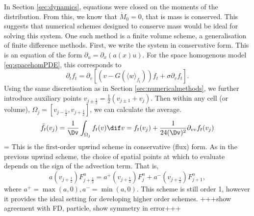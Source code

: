 In Section \ref{sec:dynamics}, equations were closed on the moments of the distribution. From this, we know that \(\dot{M}_0 = 0\), that is mass is conserved. This suggests that numerical schemes designed to conserve mass would be ideal for solving this system. One such method is a finite volume scheme, a generalisation of finite difference methods. First, we write the system in conservative form. This is an equation of the form $\partial_ u = \partial_x(a(x)u)$. For the space homogenous model \eqref{eq:spacehomPDE}, this corresponds to
\begin{equation}\label{eq:fluxspacehom}
\partial_t f_t = \partial_v \left[\left(v-G(\langle w \rangle_{f_t})\right)f_t + \sigma \partial_v f_t \right].
\end{equation}
Using the same discretisation as in Section \ref{sec:numericalmethods}, we further introduce auxiliary points $v_{j\pm\frac{1}{2}} = \frac{1}{2}(v_{j\pm 1} + v_j)$. Then within any cell (or volume), $\Omega_j = [v_{j-\frac{1}{2}}, v_{j+\frac{1}{2}}]$, we can calculate the average.
\[
\bar{f}_t(v_j) = \frac{1}{\Dv}\int_{\Omega_j} f_t(v) \dif v = f_t(v_j)+\frac{1}{24(\Dv)^2} \partial_{vv} f_t(v_j)
\]
 = 
\]
This is the first-order upwind scheme in conservative (flux) form. As in the previous upwind scheme, the choice of spatial points at which to evaluate depends on the sign of the advection term. That is,
\[
a(v_{j+\frac{1}{2}})F^n_{j+\frac{1}{2}} = a^+(v_{j+\frac{1}{2}})F^n_{j} + a^-(v_{j+\frac{1}{2}})F^n_{j+1},
\]
where $a^+ = \max(a,0), a^- = \min(a,0)$.  This scheme is still order 1, however it provides the ideal setting for developing higher order schemes.
+++show agreement with FD, particle,  show symmetry in error+++ 

%